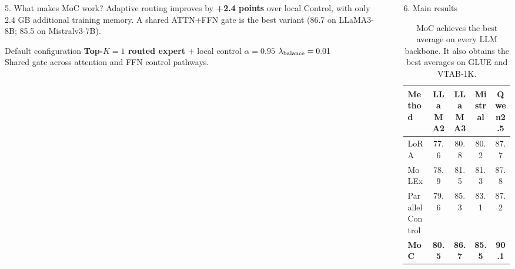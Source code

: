 \documentclass[final]{beamer}
\newlength{\sepwidth}
\newlength{\colwidth}
\newcommand{\separatorcolumn}{\begin{column}{\sepwidth}\end{column}}
\begin{document}
\begin{frame}[t]
\begin{columns}[t]
\begin{column}{\colwidth}
\begin{block}{5. What makes MoC work?}
    \vspace{0.8ex}
    Adaptive routing improves by \textbf{+2.4 points} over local Control, with
    only 2.4 GB additional training memory. A shared ATTN+FFN gate is the best
    variant (86.7 on LLaMA3-8B; 85.5 on Mistralv3-7B).

  \end{block}

  \begin{alertblock}{Default configuration}
    \centering
    \textbf{Top-$K=1$ routed expert} $+$ local control \quad\textbullet\quad
    $\alpha=0.95$ \quad\textbullet\quad $\lambda_{\rm balance}=0.01$ \\
    Shared gate across attention and FFN control pathways.
  \end{alertblock}

\end{column}

\separatorcolumn


\begin{column}{\colwidth}

  \begin{block}{6. Main results}

    \begin{table}
      \centering
      \begin{tabularx}{\linewidth}{X c c c c}
        \toprule
        \textbf{Method} & \textbf{LLaMA2} & \textbf{LLaMA3} & \textbf{Mistral} & \textbf{Qwen2.5} \\
        \midrule
        LoRA & 77.6 & 80.8 & 80.2 & 87.7 \\
        MoLEx & 78.9 & 81.5 & 81.3 & 87.8 \\
        Parallel Control & 79.6 & 85.3 & 83.1 & 87.2 \\
        \textbf{MoC} & \textbf{80.5} & \textbf{86.7} & \textbf{85.5} & \textbf{90.1} \\
        \bottomrule
      \end{tabularx}
      \caption{MoC achieves the best average on every LLM backbone. It also
      obtains the best averages on GLUE and VTAB-1K.}
    \end{table}


\end{block}
\end{column}
\end{columns}
\end{frame}
\end{document}

